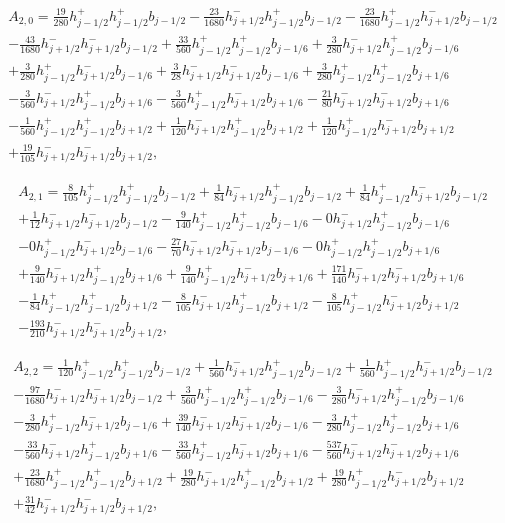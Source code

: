 \documentclass[12pt]{article}
\begin{document}
\begin{multline*} A_{2,0} = \frac{19}{280} h_{j-1/2}^+ h_{j-1/2}^+ b_{j-1/2}-\frac{23}{1680} h_{j+1/2}^- h_{j-1/2}^+ b_{j-1/2}-\frac{23}{1680} h_{j-1/2}^+ h_{j+1/2}^- b_{j-1/2}\\-\frac{43}{1680} h_{j+1/2}^- h_{j+1/2}^- b_{j-1/2}+\frac{33}{560} h_{j-1/2}^+ h_{j-1/2}^+ b_{j-1/6}+\frac{3}{280} h_{j+1/2}^- h_{j-1/2}^+ b_{j-1/6}\\+\frac{3}{280} h_{j-1/2}^+ h_{j+1/2}^- b_{j-1/6}+\frac{3}{28} h_{j+1/2}^- h_{j+1/2}^- b_{j-1/6}+\frac{3}{280} h_{j-1/2}^+ h_{j-1/2}^+ b_{j+1/6}\\-\frac{3}{560} h_{j+1/2}^- h_{j-1/2}^+ b_{j+1/6}-\frac{3}{560} h_{j-1/2}^+ h_{j+1/2}^- b_{j+1/6}-\frac{21}{80} h_{j+1/2}^- h_{j+1/2}^- b_{j+1/6}\\-\frac{1}{560} h_{j-1/2}^+ h_{j-1/2}^+ b_{j+1/2}+\frac{1}{120} h_{j+1/2}^- h_{j-1/2}^+ b_{j+1/2}+\frac{1}{120} h_{j-1/2}^+ h_{j+1/2}^- b_{j+1/2}\\+\frac{19}{105} h_{j+1/2}^- h_{j+1/2}^- b_{j+1/2}, \end{multline*}

\begin{multline*} A_{2,1} = \frac{8}{105} h_{j-1/2}^+ h_{j-1/2}^+ b_{j-1/2}+\frac{1}{84} h_{j+1/2}^- h_{j-1/2}^+ b_{j-1/2}+\frac{1}{84} h_{j-1/2}^+ h_{j+1/2}^- b_{j-1/2}\\+\frac{1}{12} h_{j+1/2}^- h_{j+1/2}^- b_{j-1/2}-\frac{9}{140} h_{j-1/2}^+ h_{j-1/2}^+ b_{j-1/6}-0 h_{j+1/2}^- h_{j-1/2}^+ b_{j-1/6}\\-0 h_{j-1/2}^+ h_{j+1/2}^- b_{j-1/6}-\frac{27}{70} h_{j+1/2}^- h_{j+1/2}^- b_{j-1/6}-0 h_{j-1/2}^+ h_{j-1/2}^+ b_{j+1/6}\\+\frac{9}{140} h_{j+1/2}^- h_{j-1/2}^+ b_{j+1/6}+\frac{9}{140} h_{j-1/2}^+ h_{j+1/2}^- b_{j+1/6}+\frac{171}{140} h_{j+1/2}^- h_{j+1/2}^- b_{j+1/6}\\-\frac{1}{84} h_{j-1/2}^+ h_{j-1/2}^+ b_{j+1/2}-\frac{8}{105} h_{j+1/2}^- h_{j-1/2}^+ b_{j+1/2}-\frac{8}{105} h_{j-1/2}^+ h_{j+1/2}^- b_{j+1/2}\\-\frac{193}{210} h_{j+1/2}^- h_{j+1/2}^- b_{j+1/2}, \end{multline*}

\begin{multline*} A_{2,2} = \frac{1}{120} h_{j-1/2}^+ h_{j-1/2}^+ b_{j-1/2}+\frac{1}{560} h_{j+1/2}^- h_{j-1/2}^+ b_{j-1/2}+\frac{1}{560} h_{j-1/2}^+ h_{j+1/2}^- b_{j-1/2}\\-\frac{97}{1680} h_{j+1/2}^- h_{j+1/2}^- b_{j-1/2}+\frac{3}{560} h_{j-1/2}^+ h_{j-1/2}^+ b_{j-1/6}-\frac{3}{280} h_{j+1/2}^- h_{j-1/2}^+ b_{j-1/6}\\-\frac{3}{280} h_{j-1/2}^+ h_{j+1/2}^- b_{j-1/6}+\frac{39}{140} h_{j+1/2}^- h_{j+1/2}^- b_{j-1/6}-\frac{3}{280} h_{j-1/2}^+ h_{j-1/2}^+ b_{j+1/6}\\-\frac{33}{560} h_{j+1/2}^- h_{j-1/2}^+ b_{j+1/6}-\frac{33}{560} h_{j-1/2}^+ h_{j+1/2}^- b_{j+1/6}-\frac{537}{560} h_{j+1/2}^- h_{j+1/2}^- b_{j+1/6}\\+\frac{23}{1680} h_{j-1/2}^+ h_{j-1/2}^+ b_{j+1/2}+\frac{19}{280} h_{j+1/2}^- h_{j-1/2}^+ b_{j+1/2}+\frac{19}{280} h_{j-1/2}^+ h_{j+1/2}^- b_{j+1/2}\\+\frac{31}{42} h_{j+1/2}^- h_{j+1/2}^- b_{j+1/2}, \end{multline*}
\end{document}

